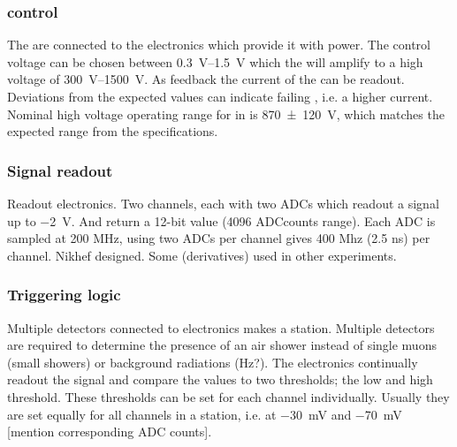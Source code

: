 \subsubsection{\pmt control}

The \pmts are connected to the \hisparc electronics which provide it with power. The control voltage can be chosen between \SIrange{.3}{1.5}{\volt} which the \pmt will amplify to a high voltage of \SIrange{300}{1500}{\volt}. As feedback the current of the \pmt can be readout. Deviations from the expected values can indicate failing \pmts, i.e. a higher current. Nominal high voltage operating range for \pmts in \hisparc is \SI{870\pm120}{\volt}, which matches the expected range from the \pmt specifications.


\subsubsection{Signal readout}

Readout electronics. Two channels, each with two ADCs which readout a signal up to \SI{-2}{\volt}. And return a 12-bit value (4096 ADCcounts range). Each ADC is sampled at 200 MHz, using two ADCs per channel gives 400 Mhz (2.5 ns) per channel. Nikhef designed. Some (derivatives) used in other experiments.


\subsubsection{Triggering logic}


%


Multiple detectors connected to \hisparc electronics makes a station. Multiple detectors are required to determine the presence of an air shower instead of single muons (small showers) or background radiations (Hz?). The \hisparc electronics continually readout the signal and compare the \adc values to two thresholds; the low and high threshold. These thresholds can be set for each channel individually. Usually they are set equally for all channels in a station, i.e. at \SI{-30}{\milli\volt} and \SI{-70}{\milli\volt} [mention corresponding ADC counts].

